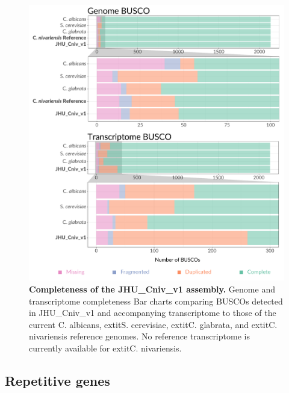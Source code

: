 \begin{figure}[!ht]
\centering
\includegraphics[width = 1\linewidth,keepaspectratio]{figure/busco.pdf}
\caption[Completeness of the JHU\_Cniv\_v1 assembly]{{\bf Completeness of the JHU\_Cniv\_v1 assembly.} Genome and transcriptome completeness Bar charts comparing BUSCOs detected in JHU\_Cniv\_v1 and accompanying transcriptome to those of the current C. albicans, 	extit{S. cerevisiae}, 	extit{C. glabrata}, and 	extit{C. nivariensis} reference genomes. No reference transcriptome is currently available for 	extit{C. nivariensis}. }
\label{fig:asms}
\end{figure}


\subsection{Repetitive genes}
\label{sec:repgenes}

